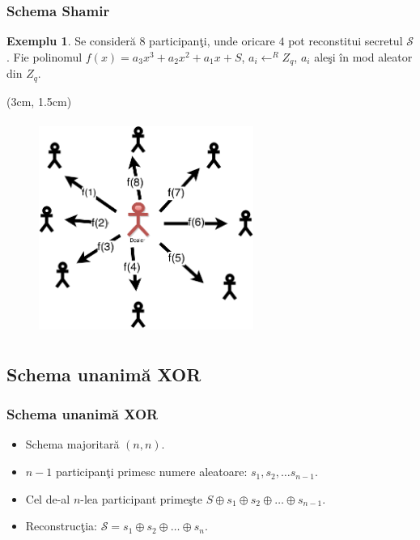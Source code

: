 \documentclass{beamer}
\theoremstyle{definition}
\newtheorem{my_example}[theorem]{Exemplu}
\begin{document}
\begin{frame}
    \frametitle{Schema Shamir}
     {
        \begin{my_example}
           Se consider\u{a} 8 participan\c{t}i, unde oricare $4$ pot reconstitui secretul $\mathcal{S}$.
           Fie polinomul $f(x) = a_3x ^ 3 + a_2x ^ 2 + a_1x + S$, $a_i \leftarrow^R Z_q$, $a_i$ ale\c{s}i \^{i}n mod aleator din $Z_q$.
        \end{my_example}
    }
     {
     \begin{textblock*}{4cm}(3cm, 1.5cm)
        \begin{figure}
            \includegraphics[width=7cm,height=7cm,keepaspectratio]{img/shamir/shamir-split.png}
       \end{figure}
        \end{textblock*}
 
    }
\end{frame}

\subsection{Schema unanim\u{a} XOR}
\begin{frame}
    \frametitle{Schema unanim\u{a} XOR}
    \begin{itemize}
        \item Schema majoritar\u{a} $(n,n)$.
        \pause
        \item $n-1$ participan\c{t}i primesc numere aleatoare: $s_1, s_2, \dots s_{n-1}$.
        \pause
        \item Cel de-al $n$-lea participant prime\c{s}te $S \oplus s_1 \oplus s_2 \oplus \dots \oplus s_{n-1}$.
        \pause
        \item Reconstruc\c{t}ia: $\mathcal{S} = s_1 \oplus s_2 \oplus \dots \oplus s_n$.
    \end{itemize}
\end{frame}
\end{document}
